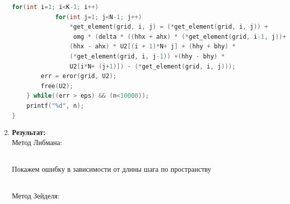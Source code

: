 \documentclass[12pt]{article}
\begin{document}
\begin{enumerate}
\begin{lstlisting}[language=C]
        for(int i=1; i<K-1; i++)
            for(int j=1; j<N-1; j++)
                *get_element(grid, i, j) = (*get_element(grid, i, j)) +
                 omg * (delta * ((hhx + ahx) * (*get_element(grid, i-1, j))+
                (hhx - ahx) * U2[(i + 1)*N+ j] + (hhy + bhy) *
                (*get_element(grid, i, j-1)) +(hhy - bhy) *
                U2[i*N+ (j+1)]) - (*get_element(grid, i, j)));
        err = eror(grid, U2);
        free(U2);
    } while((err > eps) && (n<10000));
    printf("%d", n);
}
\end{lstlisting}
        \item \textbf{Результат:}\\
        Метод Либмана:
        \begin{figure}[h]
            \label{ris:image}
        \end{figure}\\
        \newpage
        Покажем ошибку в зависимости от длины шага по пространству
        \begin{figure}[h]
            \label{ris:image}
        \end{figure}\\
        Метод Зейделя:
        \begin{figure}[h]

\end{figure}
\end{enumerate}
\end{document}
